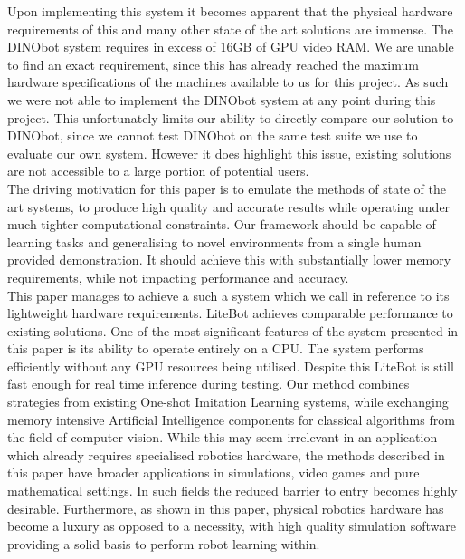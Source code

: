 Upon implementing this system it becomes apparent that the physical hardware requirements of this and many other state of the art solutions are immense. The DINObot system requires in excess of 16GB of GPU video RAM. We are unable to find an exact requirement, since this has already reached the maximum hardware specifications of the machines available to us for this project. As such we were not able to implement the DINObot system at any point during this project. This unfortunately limits our ability to directly compare our solution to DINObot, since we cannot test DINObot on the same test suite we use to evaluate our own system. However it does highlight this issue, existing solutions are not accessible to a large portion of potential users.\\

The driving motivation for this paper is to emulate the methods of state of the art systems, to produce high quality and accurate results while operating under much tighter computational constraints. Our framework should be capable of learning tasks and generalising to novel environments from a single human provided demonstration. It should achieve this with substantially lower memory requirements, while not impacting performance and accuracy.\\

This paper manages to achieve a such a system which we call  in reference to its lightweight hardware requirements. LiteBot achieves comparable performance to existing solutions. One of the most significant features of the system presented in this paper is its ability to operate entirely on a CPU. The system performs efficiently without any GPU resources being utilised. Despite this LiteBot is still fast enough for real time inference during testing. Our method combines strategies from existing One-shot Imitation Learning systems, while exchanging memory intensive Artificial Intelligence components for classical algorithms from the field of computer vision. While this may seem irrelevant in an application which already requires specialised robotics hardware, the methods described in this paper have broader applications in simulations, video games and pure mathematical settings. In such fields the reduced barrier to entry becomes highly desirable. Furthermore, as shown in this paper, physical robotics hardware has become a luxury as opposed to a necessity, with high quality simulation software providing a solid basis to perform robot learning within.\\

